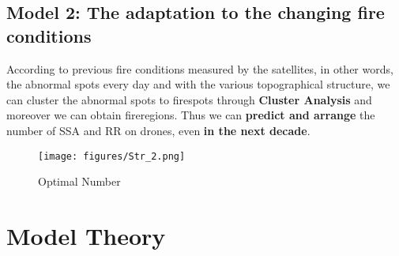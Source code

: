 \documentclass{mcmthesis}
\begin{document}
\subsection{Model 2: The adaptation to the changing fire conditions}
According to previous fire conditions measured by the satellites, in other words, 
the abnormal spots every day and with the various topographical structure, we can cluster the abnormal spots to firespots through
\textbf{Cluster Analysis} and moreover we can obtain fireregions. Thus we can \textbf{predict
and arrange} the number of SSA and RR on drones, even \textbf{in the next decade}.
\vspace{5pt}
\begin{figure}[htbp]
  \centering
  \texttt{[image: figures/Str\_2.png]}
  \caption{Optimal Number}
  \label{Optimal Number}
\end{figure}









\section{Model Theory}
\end{document}
